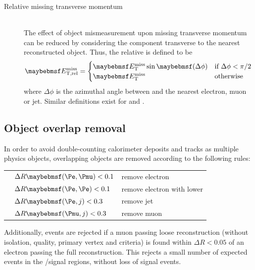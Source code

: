\begin{description}
\item[Relative missing transverse momentum] \hfill \\
	The effect of object mismeasurement upon missing transverse momentum can be reduced 
	by considering the component transverse to the nearest reconstructed object. Thus, 
	the relative \met is defined to be
	\begin{equation}
		\metrel = 
		\begin{cases}
			\met\sin\parenths{\Delta\phi} & \text{if~} \Delta\phi < \pi/2 \\
			\met & \text{otherwise}
		\end{cases}
	\end{equation}
	where $\Delta\phi$ is the azimuthal angle between \metvec and the nearest electron, muon 
	or jet. Similar definitions exist for \trackmetrel and \corrtrackmetrel.

\end{description}



\subsection{Object overlap removal}
\label{sec:objects:overlap}

In order to avoid double-counting calorimeter deposits and tracks as multiple physics 
objects, overlapping objects are removed according to the following rules:

\begin{listliketab}
	\begin{tabular}{Ll@{\hskip 0.3in}l}
		\textbullet & $\Delta R \parenths{\Pe,\Pmu} < 0.1$ & remove electron \\
		\textbullet & $\Delta R \parenths{\Pe,\Pe}  < 0.1$ & remove electron with lower \pt \\
		\textbullet & $\Delta R \parenths{\Pe,j}    < 0.3$ & remove jet \\
		\textbullet & $\Delta R \parenths{\Pmu,j}   < 0.3$ & remove muon \\
	\end{tabular}
\end{listliketab}

\noindent
Additionally, events are rejected if a muon passing loose reconstruction (\ie without 
isolation, quality, primary vertex and \pt criteria) is found within $\Delta R < 0.05$ of an 
electron passing the full reconstruction. This rejects a small number of expected 
\HepProcess{\PZ \HepTo \Pmu\Pmu} events in the \emch/\mech signal regions, without loss of 
signal events.

